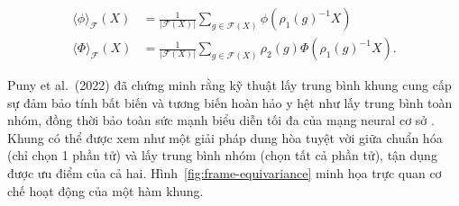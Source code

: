 \begin{align}
    \langle \phi \rangle_\mathcal{F}(X) &= \frac{1}{|\mathcal{F}(X)|} \sum_{g \in \mathcal{F}(X)} \phi(\rho_1(g)^{-1}X) \\
    \langle \Phi \rangle_\mathcal{F}(X) &= \frac{1}{|\mathcal{F}(X)|} \sum_{g \in \mathcal{F}(X)} \rho_2(g)\Phi(\rho_1(g)^{-1}X).
\end{align}

Puny et al.\ (2022) đã chứng minh rằng kỹ thuật lấy trung bình khung cung cấp sự đảm bảo tính bất biến và tương biến hoàn hảo y hệt như lấy trung bình toàn nhóm, đồng thời bảo toàn sức mạnh biểu diễn tối đa của mạng neural cơ sở \cite{puny2022frame}. Khung có thể được xem như một giải pháp dung hòa tuyệt vời giữa chuẩn hóa (chỉ chọn 1 phần tử) và lấy trung bình nhóm (chọn tất cả phần tử), tận dụng được ưu điểm của cả hai. Hình~\ref{fig:frame-equivariance} minh họa trực quan cơ chế hoạt động của một hàm khung.

